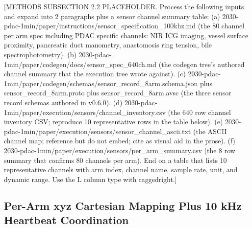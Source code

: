 [METHODS SUBSECTION 2.2 PLACEHOLDER. Process the following inputs and expand into 2 paragraphs plus a sensor channel summary table:
(a) 2030-pdac-1min/paper/instructions/sensor_specification_100khz.md (the 80 channel per arm spec including PDAC specific channels: NIR ICG imaging, vessel surface proximity, pancreatic duct manometry, anastomosis ring tension, bile spectrophotometry).
(b) 2030-pdac-1min/paper/codegen/docs/sensor_spec_640ch.md (the codegen tree's authored channel summary that the execution tree wrote against).
(c) 2030-pdac-1min/paper/codegen/schemas/sensor_record_8arm.schema.json plus sensor_record_8arm.proto plus sensor_record_8arm.avsc (the three sensor record schemas authored in v0.6.0).
(d) 2030-pdac-1min/paper/execution/sensors/channel_inventory.csv (the 640 row channel inventory CSV; reproduce 10 representative rows in the table below).
(e) 2030-pdac-1min/paper/execution/sensors/sensor_channel_ascii.txt (the ASCII channel map; reference but do not embed; cite as visual aid in the prose).
(f) 2030-pdac-1min/paper/execution/sensors/per_arm_summary.csv (the 8 row summary that confirms 80 channels per arm).
End on a table that lists 10 representative channels with arm index, channel name, sample rate, unit, and dynamic range. Use the L column type with raggedright.]

\subsection{Per-Arm xyz Cartesian Mapping Plus 10 kHz Heartbeat Coordination}
\label{sec:methods-xyz}

